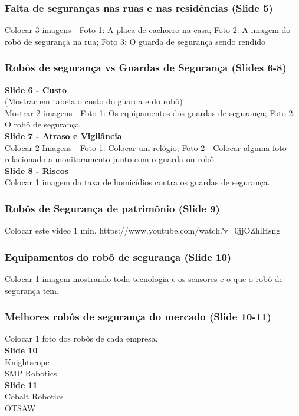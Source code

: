 \documentclass[12pt,a4paper]{article}
\begin{document}
    \subsubsection{Falta de seguranças nas ruas e nas residências (Slide 5)}
    Colocar 3 imagens - Foto 1: A placa de cachorro na casa; Foto 2: A imagem do robô de segurança na rua; Foto 3: O guarda de segurança sendo rendido 

    \subsubsection{Robôs de segurança vs Guardas de Segurança (Slides 6-8)}
    \textbf{Slide 6 - Custo} \\
    (Mostrar em tabela o custo do guarda e do robô) \\
    Mostrar 2 imagens - Foto 1: Os equipamentos dos guardas de segurança; Foto 2: O robô de segurança \\
    \textbf{Slide 7 - Atraso e Vigilância} \\
    Colocar 2 Imagens - Foto 1: Colocar um relógio; Foto 2 - Colocar alguma foto relacionado a monitoramento junto com o guarda ou robô \\
    \textbf{Slide 8 - Riscos} \\
    Colocar 1 imagem da taxa de homicídios contra os guardas de segurança.

    \subsubsection{Robôs de Segurança de patrimônio (Slide 9)}
    Colocar este vídeo 1 min. https://www.youtube.com/watch?v=0jjOZhlHsng

    \subsubsection{Equipamentos do robô de segurança (Slide 10)}
    Colocar 1 imagem mostrando toda tecnologia e os sensores e o que o robô de segurança tem.

    \subsubsection{Melhores robôs de segurança do mercado (Slide 10-11)}
    Colocar 1 foto dos robôs de cada empresa. \\
    \textbf{Slide 10} \\
    Knightscope \\
    SMP Robotics \\
    \textbf{Slide 11} \\
    Cobalt Robotics \\
    OTSAW
\end{document}
